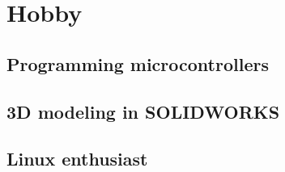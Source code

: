 \documentclass[10pt]{article}
\begin{document}
\section{Hobby}
\subsection{Programming microcontrollers}
\subsection{3D modeling in SOLIDWORKS}
\subsection{Linux enthusiast}
\end{document}
